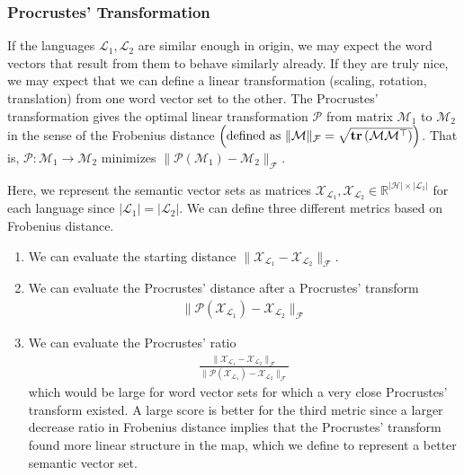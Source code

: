 \documentclass[12pt, usenames]{article}
\theoremstyle{definition}
\theoremstyle{definition}
\theoremstyle{definition}
\newcommand{\txt}[1]
{\textnormal{#1}}
\newcommand{\mc}[1]
{\mathcal{#1}}
\begin{document}
\subsubsection{Procrustes' Transformation}

If the languages $\mc{L}_1, \mc{L}_2$ are similar enough in origin, we may expect the word vectors that result from them to behave similarly already. If they are truly nice, we may expect that we can define a linear transformation (scaling, rotation, translation) from one word vector set to the other. The Procrustes' transformation gives the optimal linear transformation $\mc{P}$ from matrix $\mc{M}_1$ to $\mc{M}_2$ in the sense of the Frobenius distance $\left(\txt{defined as }\|\mc{M}\|_{\mc{F}} = \sqrt{\textbf{tr}\left(\mc{M}\mc{M}^{\top}\right)}\right)$. That is, $\mc{P}:\mc{M}_1 \to \mc{M}_2$ minimizes $\|\mc{P}\left(\mc{M}_1\right) - \mc{M}_2\|_{\mc{F}}$. 

Here, we represent the semantic vector sets as matrices $\mc{X}_{\mc{L}_1}, \mc{X}_{\mc{L}_2} \in \mathbb{R}^{|\mc{H}| \times |\mc{L}_1|}$ for each language since $|\mc{L}_1| = |\mc{L}_2|$.
We can define three different metrics based on Frobenius distance. 
\begin{enumerate}

\item We can evaluate the starting distance $\|\mc{X}_{\mc{L}_1} - \mc{X}_{\mc{L}_2}\|_\mc{F}$. 

\item We can evaluate the Procrustes' distance after a Procrustes' transform 
\begin{align}
\label{procrustes1}
\|\mc{P}\left(\mc{X}_{\mc{L}_1}\right) - \mc{X}_{\mc{L}_2}\|_\mc{F} 
\end{align}

\item We can evaluate the Procrustes' ratio
\begin{align}
\label{procrustes2}
\frac{\|\mc{X}_{\mc{L}_1} - \mc{X}_{\mc{L}_2}\|_\mc{F}}{\|\mc{P}\left(\mc{X}_{\mc{L}_1}\right) - \mc{X}_{\mc{L}_2}\|_\mc{F}}
\end{align}
which would be large for word vector sets for which a very close Procrustes' transform existed. A large score is better for the third metric since a larger decrease ratio in Frobenius distance implies that the Procrustes' transform found more linear structure in the map, which we define to represent a better semantic vector set.
\end{enumerate}
\end{document}
